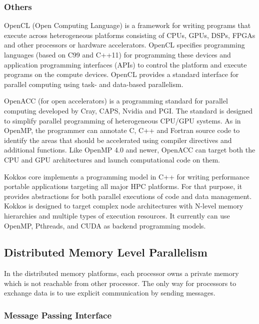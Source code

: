 \subsubsection{Others}

OpenCL (Open Computing Language) is a framework for writing programs that execute across heterogeneous platforms consisting of CPUs, GPUs, DSPs, FPGAs and other processors or hardware accelerators. OpenCL specifies programming languages (based on C99 and C++11) for programming these devices and application programming interfaces (APIs) to control the platform and execute programs on the compute devices. OpenCL provides a standard interface for parallel computing using task- and data-based parallelism.

OpenACC (for open accelerators) is a programming standard for parallel computing developed by Cray, CAPS, Nvidia and PGI. The standard is designed to simplify parallel programming of heterogeneous CPU/GPU systems. As in OpenMP, the programmer can annotate C, C++ and Fortran source code to identify the areas that should be accelerated using compiler directives and additional functions. Like OpenMP 4.0 and newer, OpenACC can target both the CPU and GPU architectures and launch computational code on them.

Kokkos \cite{edwards2014kokkos} core implements a programming model in C++ for writing performance portable applications targeting all major HPC platforms. For that purpose, it provides abstractions for both parallel executions of code and data management. Kokkos is designed to target complex node architectures with N-level memory hierarchies and multiple types of execution resources. It currently can use OpenMP, Pthreads, and CUDA as backend programming models.


\subsection{Distributed Memory Level Parallelism}

In the distributed memory platforms, each processor owns a private memory which is not reachable from other processor. The only way for processors to exchange data is to use explicit communication by sending messages. 

\subsubsection{Message Passing Interface}

